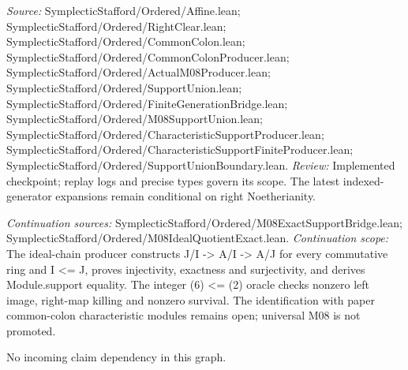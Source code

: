\emph{Source:} SymplecticStafford/Ordered/Affine.lean; SymplecticStafford/Ordered/RightClear.lean; SymplecticStafford/Ordered/CommonColon.lean; SymplecticStafford/Ordered/CommonColonProducer.lean; SymplecticStafford/Ordered/ActualM08Producer.lean; SymplecticStafford/Ordered/SupportUnion.lean; SymplecticStafford/Ordered/FiniteGenerationBridge.lean; SymplecticStafford/Ordered/M08SupportUnion.lean; SymplecticStafford/Ordered/CharacteristicSupportProducer.lean; SymplecticStafford/Ordered/CharacteristicSupportFiniteProducer.lean; SymplecticStafford/Ordered/SupportUnionBoundary.lean.
\emph{Review:} Implemented checkpoint; replay logs and precise types govern its scope. The latest indexed-generator expansions remain conditional on right Noetherianity.

\emph{Continuation sources:} SymplecticStafford/Ordered/M08ExactSupportBridge.lean; SymplecticStafford/Ordered/M08IdealQuotientExact.lean.
\emph{Continuation scope:} The ideal-chain producer constructs J/I -> A/I -> A/J for every commutative ring and I <= J, proves injectivity, exactness and surjectivity, and derives Module.support equality. The integer (6) <= (2) oracle checks nonzero left image, right-map killing and nonzero survival. The identification with paper common-colon characteristic modules remains open; universal M08 is not promoted.

No incoming claim dependency in this graph.

